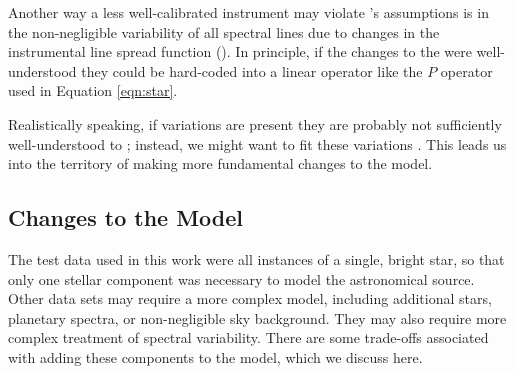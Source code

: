 \documentclass[twocolumn]{aastex62}
\begin{document}
Another way a less well-calibrated instrument may violate \wobble's assumptions is in the non-negligible variability of all spectral lines due to changes in the instrumental line spread function (\LSF). 
In principle, if the changes to the \LSF were well-understood they could be hard-coded into a linear operator like the $P$ operator used in Equation \ref{eqn:star}. 

Realistically speaking, if \LSF variations are present they are probably not sufficiently well-understood to ; instead, we might want to fit these variations . 
This leads us into the territory of making more fundamental changes to the \wobble model.

\subsection{Changes to the Model}
\label{s:model-changes}
 
The test data used in this work were all instances of a single, bright star, so that only one stellar component was necessary to model the astronomical source. 
Other data sets may require a more complex model, including additional stars, planetary spectra, or non-negligible sky background. 
They may also require more complex treatment of spectral variability. 
There are some trade-offs associated with adding these components to the model, which we discuss here.
\end{document}
